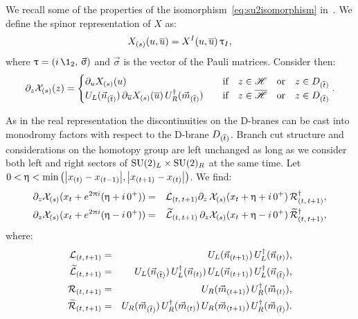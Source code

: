 We recall some of the properties of the isomorphism~\eqref{eq:su2isomorphism} in~.
We define the spinor representation of $X$ as:
\begin{equation}
  X_{(s)}( u, \overline{u} ) = X^I( u, \overline{u} )\, \uptau_I,
\end{equation}
where $\tau = \qty( i\, \1_2,\, \vec{\sigma} )$ and $\vec{\sigma}$ is the vector of the Pauli matrices.
Consider then:
\begin{equation}
  \ipd{z} \cX_{(s)}( z )
  =
  \begin{cases}
    \ipd{u} X_{(s)}(u)
    & \qif
    z \in \ccH \qor z \in D_{(\bart)}
    \\
    U_{L}(\vec{n}_{(\bart)})\,
    \ipd{\baru} X_{(s)}(\baru)\,
    U_{R}^{\dagger}(\vec{m}_{(\bart)})
    & \qif z \in \bccH \qor z \in D_{(\bart)}
  \end{cases}.
  \label{eq:spinor_doubling_trick}
\end{equation}

As in the real representation the discontinuities on the D-branes can be cast into monodromy factors with respect to the D-brane $D_{(\overline{t})}$. Branch cut structure and considerations on the homotopy group are left unchanged as long as we consider both left and right sectors of $\mathrm{SU}(2)_L \times \mathrm{SU}(2)_R$ at the same time.
Let $0 < \upeta < \min\qty( \abs{x_{(t)} - x_{(t-1)}}, \abs{x_{(t+1)} - x_{(t)}} )$.
We find:
\begin{eqnarray}
  \partial_{z} \mathcal{X}_{(s)}( x_t + e^{2 \uppi i}( \upeta + i\, 0^+) )
  & = &
  \mathcal{L}_{(t,\, t+1)} \partial_{z}\,
  \mathcal{X}_{(s)}( x_t + \upeta + i\, 0^+ )\,
  \mathcal{R}_{(t,\, t+1)}^{\dagger},
  \label{eq:top_spinor_monodromy}
  \\
  \partial_{z} \mathcal{X}_{(s)}( x_t + e^{2 \uppi i}( \upeta - i\, 0^+) )
  & = &
  \widetilde{\mathcal{L}}_{(t,\, t+1)}\,
  \partial_{z} \mathcal{X}_{(s)}( x_t + \upeta - i\, 0^+ )\,
  \widetilde{\mathcal{R}}_{(t,\, t+1)}^{\dagger},
  \label{eq:bottom_spinor_monodromy}
\end{eqnarray}
  where:
\begin{eqnarray}
  \mathcal{L}_{(t,\, t+1)}
  & = &
  U_{L}(\vec{n}_{(t+1)})\,
  U_{L}^{\dagger}(\vec{n}_{(t)}),
  \\
  \widetilde{\mathcal{L}}_{(t,\, t+1)}
  & = &
  U_{L}(\vec{n}_{(\overline{t})})\,
  U_{L}^{\dagger}(\vec{n}_{(t)})\,
  U_{L}(\vec{n}_{(t+1)})\,
  U_{L}^{\dagger}(\vec{n}_{(\overline{t})}),
  \\
  \mathcal{R}_{(t,\, t+1)}
  & = &
  U_{R}(\vec{m}_{(t+1)})\,
  U_{R}^{\dagger}(\vec{m}_{(t)}),
  \\
  \widetilde{\mathcal{R}}_{(t,\, t+1)}
  & = &
  U_{R}(\vec{m}_{(\overline{t})})\,
  U_{R}^{\dagger}(\vec{m}_{(t)})\,
  U_{R}(\vec{m}_{(t+1)})\,
  U_{R}^{\dagger}(\vec{m}_{(\overline{t})}).
\end{eqnarray}

